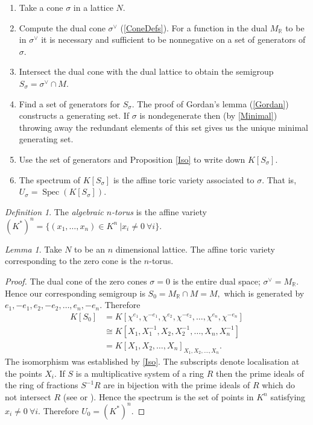\documentclass[BSc]{usydthesis}
\numberwithin{equation}{chapter}
\theoremstyle{remark}
\newtheorem{Definition}[equation]{Definition}
\newtheorem{Lemma}[equation]{Lemma}
\newcommand{\R}{\mathbb{R}}
\newcommand{\V}{\vee}
\DeclareMathOperator{\Spec}{Spec}
\begin{document}
\begin{enumerate}
 \item Take a cone $\sigma$ in a lattice $N.$
 \item Compute the dual cone $\sigma^{\V}$ (\ref{ConeDefs}). For a function in the dual $M_{\R}$ to be in $\sigma^{\V}$ it is necessary and sufficient to be nonnegative on a set of generators of $\sigma.$
 \item Intersect the dual cone with the dual lattice to obtain the semigroup $S_{\sigma}= \sigma^{\V} \cap M.$ 
 \item Find a set of generators for $S_{\sigma}.$ The proof of Gordan's lemma (\ref{Gordan}) constructs a generating set. If $\sigma$ is nondegenerate then (by \ref{Minimal}) throwing away the redundant elements of this set gives us the unique minimal generating set. 
 \item Use the set of generators and Proposition \ref{Iso} to write down $K[S_{\sigma}].$ 
 \item The spectrum of $K[S_{\sigma}]$ is the affine toric variety associated to $\sigma.$ That is, $U_{\sigma} = \Spec (K[S_{\sigma}]).$
\end{enumerate}

\begin{Definition} The {\em algebraic $n$-torus} is the affine variety $(K^*)^n = \{ (x_1, \ldots, x_n) \in K^n \ | x_i\neq 0 \ \forall i\}.$
\end{Definition}

\begin{Lemma}\label{zerotorus} Take $N$ to be an $n$ dimensional lattice. The affine toric variety corresponding to the zero cone is the $n$-torus.
\end{Lemma}

\begin{proof} The dual cone  of the zero cones $\sigma = 0$ is the entire dual space; $\sigma^{\V} = M_{\R}.$ Hence our corresponding semigroup is $S_{0} = M_{\R} \cap M = M,$ which is generated by $e_1, -e_1, e_2, -e_2, \ldots, e_n, -e_n.$ Therefore
\begin{align*}
K[S_0] &= K[\chi^{e_1}, \chi^{-e_1}, \chi^{e_2}, \chi^{-e_2}, \ldots , \chi^{e_n}, \chi^{-e_n}] \\
        &\cong K[X_1, X_1^{-1}, X_2, X_2^{-1}, \ldots, X_n, X_n^{-1}] \\
				&=K[X_1, X_2, \ldots, X_n]_{X_1, X_2, \ldots, X_n}.
\end{align*}
The isomorphism was established by \ref{Iso}. The subscripts denote localisation at the points $X_i.$ If $S$ is a multiplicative system of a ring $R$ then the prime ideals of the ring of fractions $S^{-1}R$ are in bijection with the prime ideals of $R$ which do not intersect $R$ (see \cite[Page.~ 41, Prop. 3.11]{A&M} or \cite[Page.~ 70, \S 2.5, Prop.~ 11ii)]{Bourbaki}). Hence the spectrum is the set of points in $K^n$ satisfying $x_i \neq 0 \ \forall i.$ Therefore $U_0 = (K^*)^n.$

\end{proof}
\end{document}
